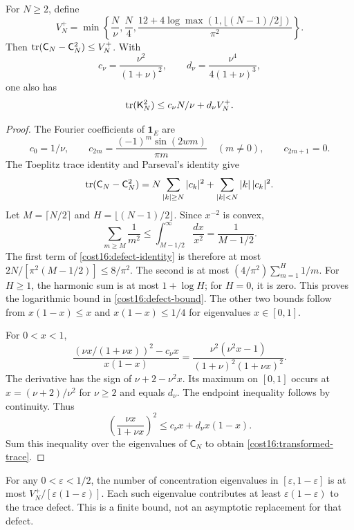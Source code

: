 \begin{lemma}
\label{cost16:trace-defect}
For $N\ge2$, define
\begin{equation}
 V_N^+=\min\left\{
 \frac N\nu,\frac N4,
 \frac{12+4\log\max(1,\lfloor(N-1)/2\rfloor)}{\pi^2}\right\}.
 \label{cost16:defect-bound}
\end{equation}
Then $\operatorname{tr}(\mathsf C_N-\mathsf C_N^2)\le V_N^+$. With
\begin{equation}
 c_\nu=\frac{\nu^2}{(1+\nu)^2},\qquad
 d_\nu=\frac{\nu^4}{4(1+\nu)^3},
 \label{cost16:majorant-constants}
\end{equation}
one also has
\begin{equation}
 \operatorname{tr}(\mathsf K_N^2)\le c_\nu N/\nu+d_\nu V_N^+.
 \label{cost16:transformed-trace}
\end{equation}
\end{lemma}
\begin{proof}
The Fourier coefficients of $\mathbf1_E$ are
\[
 c_0=1/\nu,\qquad
 c_{2m}=\frac{(-1)^m\sin(2wm)}{\pi m}\quad(m\ne0),
 \qquad c_{2m+1}=0.
\]
The Toeplitz trace identity and Parseval's identity give
\begin{equation}
 \operatorname{tr}(\mathsf C_N-\mathsf C_N^2)
 =N\sum_{|k|\ge N}|c_k|^2+
                  \sum_{|k|<N}|k|\,|c_k|^2.
 \label{cost16:defect-identity}
\end{equation}
Let $M=\lceil N/2\rceil$ and $H=\lfloor(N-1)/2\rfloor$. Since $x^{-2}$ is convex,
\[
 \sum_{m\ge M}\frac1{m^2}
 \le\int_{M-1/2}^{\infty}\frac{dx}{x^2}
 =\frac1{M-1/2}.
\]
The first term of \eqref{cost16:defect-identity} is therefore at most $2N/[\pi^2(M-1/2)]\le8/\pi^2$. The second is at most $(4/\pi^2)\sum_{m=1}^{H}1/m$. For $H\ge1$, the harmonic sum is at most $1+\log H$; for $H=0$, it is zero. This proves the logarithmic bound in \eqref{cost16:defect-bound}. The other two bounds follow from $x(1-x)\le x$ and $x(1-x)\le1/4$ for eigenvalues $x\in[0,1]$.

For $0<x<1$,
\[
 \frac{(\nu x/(1+\nu x))^2-c_\nu x}{x(1-x)}
 =\frac{\nu^2(\nu^2x-1)}{(1+\nu)^2(1+\nu x)^2}.
\]
The derivative has the sign of $\nu+2-\nu^2x$. Its maximum on $[0,1]$ occurs at $x=(\nu+2)/\nu^2$ for $\nu\ge2$ and equals $d_\nu$. The endpoint inequality follows by continuity. Thus
\[
 \left(\frac{\nu x}{1+\nu x}\right)^2
 \le c_\nu x+d_\nu x(1-x).
\]
Sum this inequality over the eigenvalues of $\mathsf C_N$ to obtain \eqref{cost16:transformed-trace}.
\end{proof}

For any $0<\varepsilon<1/2$, the number of concentration eigenvalues in $[\varepsilon,1-\varepsilon]$ is at most $V_N^+/[\varepsilon(1-\varepsilon)]$. Each such eigenvalue contributes at least $\varepsilon(1-\varepsilon)$ to the trace defect. This is a finite bound, not an asymptotic replacement for that defect.

